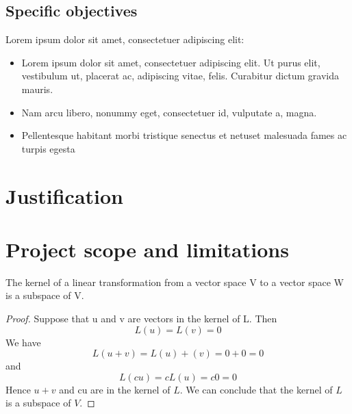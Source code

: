 \subsection{Specific objectives}
Lorem ipsum dolor sit amet, consectetuer adipiscing elit:
\begin{itemize}
    \item Lorem ipsum dolor sit amet, consectetuer adipiscing elit. Ut purus elit, vestibulum ut, placerat ac, adipiscing vitae, felis. Curabitur dictum gravida mauris.
    \item Nam arcu libero, nonummy eget, consectetuer id, vulputate a, magna.
    \item  Pellentesque habitant morbi tristique senectus et netuset malesuada fames ac turpis egesta
\end{itemize}

\section{Justification}
\lipsum[1]

\section{Project scope and limitations}
\lipsum[1]
\begin{theorem}
The kernel of a linear transformation from a vector space V to a vector space W is a subspace of V.
\end{theorem}
\begin{proof}
    Suppose that u and v are vectors in the kernel of L.  Then 
    \begin{equation}
        L(u) = L(v) = 0
    \end{equation}
    We have
    \begin{equation}
        L(u + v) = L(u) + (v) = 0 + 0 = 0 
    \end{equation}
    and
    \begin{equation}
        L(cu) = cL(u) = c0 = 0
    \end{equation}
    Hence $u + v$ and cu are in the kernel of $L$. We can conclude that the kernel of $L$ is a subspace of $V$.
\end{proof}
\lipsum[1]

